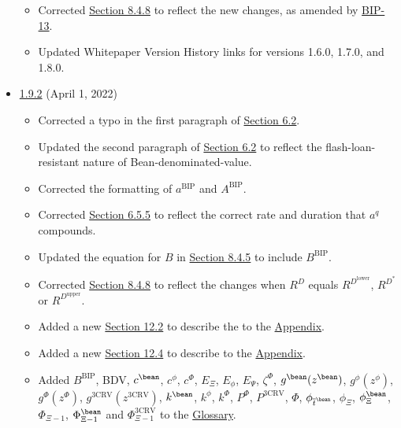 \documentclass[class=article, crop=false]{standalone}
\begin{document}
\begin{itemize}[topsep=0pt, itemsep=3pt,leftmargin=16pt]
\begin{itemize}
        \item Corrected \hyperlink{subsubsection.8.4.8}{Section 8.4.8} to reflect the new  changes, as amended by \href{https://github.com/BeanstalkFarms/Beanstalk-Governance-Proposals/blob/master/bip/bip-13-weather-changes.md}{BIP-13}.
        \item Updated Whitepaper Version History links for versions 1.6.0, 1.7.0, and 1.8.0.
    \end{itemize}
        \item \href{https://github.com/BeanstalkFarms/Beanstalk/blob/master/version-history/beanstalk1_9_2.pdf}{1.9.2} (April 1, 2022)
    \begin{itemize}
        \item Corrected a typo in the first paragraph of \hyperlink{subsection.6.2}{Section 6.2}.
        \item Updated the second paragraph of \hyperlink{subsection.6.2}{Section 6.2} to reflect the flash-loan-resistant nature of Bean-denominated-value.
        \item Corrected the formatting of $a^{\text{BIP}}$ and $A^{\text{BIP}}$.
        \item Corrected \hyperlink{subsubsection.6.5.5}{Section 6.5.5} to reflect the correct rate and duration that $a^q$ compounds.
        \item Updated the equation for $B$ in \hyperlink{subsubsection.8.4.5}{Section 8.4.5} to include $B^{\text{BIP}}$.
        \item Corrected \hyperlink{subsubsection.8.4.8}{Section 8.4.8} to reflect the  changes when $R^D$ equals $R^{D^{\text{lower}}}$, $R^{D^*}$ or $R^{D^{\text{upper}}}$.
        \item Added a new \hyperlink{subsection.12.2}{Section 12.2} to describe the   to the \hyperlink{section.12}{Appendix}.
        \item Added a new \hyperlink{subsection.12.4}{Section 12.4} to describe  to the \hyperlink{section.12}{Appendix}.
        \item Added $B^{\text{BIP}}$, BDV, $c^{\bean}$, $c^{\phi}$, $c^{\Phi}$, $E_{\Xi}$, $E_{\phi}$, $E_{\Psi}$, $\zeta^{\Phi}$, $g^{\bean}(z^{\bean})$, $g^{\phi}(z^{\phi})$, $g^{\Phi}(z^{\Phi})$, $g^{\text{3CRV}}(z^{\text{3CRV}})$, $k^{\bean}$, $k^{\phi}$, $k^{\Phi}$, $P^{\Phi}$, $P^{\text{3CRV}}$, $\Phi$, $\phi_{\overline{t}^{\bean}}$, $\phi_{\Xi}$, $\phi_{\Xi}^{\bean}$, $\Phi_{\Xi-1}$, $\Phi_{\Xi-1}^{\bean}$ and $\Phi_{\Xi-1}^{\text{3CRV}}$ to the \hyperlink{subsection.12.2}{Glossary}. 

\end{itemize}
\end{itemize}
\end{document}

